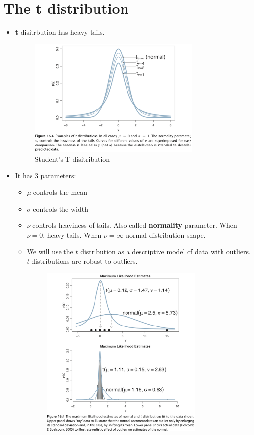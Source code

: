 \documentclass[a4paper]{article}
\begin{document}
\section{The \textbf{t} distribution} 
\begin{itemize}
    \item \textbf{t} disitrbution has heavy tails. 
    \begin{figure}[H]
        \centering
        \includegraphics[width=0.8\textwidth]{t_distribution}
        \caption{Student's T disitribution}
        \label{fig:t_distribution}
    \end{figure}
    \item It has 3 parameters:
    \begin{itemize}
        \item $\mu$ controls the mean
        \item $\sigma$ controls the width
        \item $\nu$ controls heaviness of tails. Also called \textbf{normality} parameter. When $\nu = 0$, heavy tails. When $\nu = \infty$ normal distribution shape. 
        \item We will use the $t$ distribution as a descriptive model of data with outliers. $t$ distributions are robust to outliers.
        \begin{figure}[H]
            \centering
            \includegraphics[width=0.8\textwidth]{t_distribution_outliers}

\end{figure}
\end{itemize}
\end{itemize}
\end{document}
